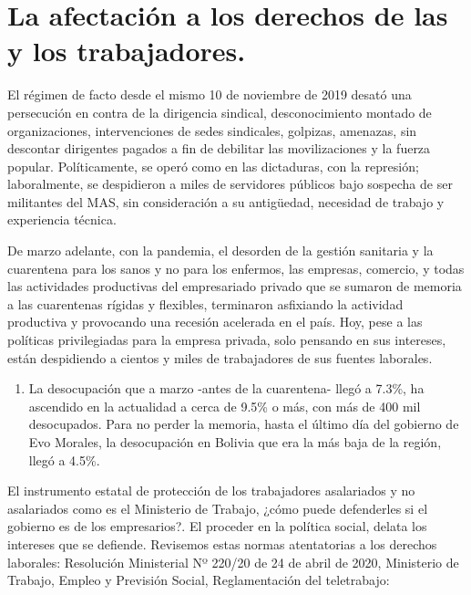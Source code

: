 \documentclass[a4paper, nobind]{templates/ociamthesis}
\providecommand{\tightlist}{%
  \setlength{\itemsep}{0pt}\setlength{\parskip}{0pt}}
\begin{document}
\hypertarget{la-afectaciuxf3n-a-los-derechos-de-las-y-los-trabajadores.}{%
\chapter{La afectación a los derechos de las y los trabajadores.}\label{la-afectaciuxf3n-a-los-derechos-de-las-y-los-trabajadores.}}

El régimen de facto desde el mismo 10 de noviembre de 2019 desató una persecución en contra de la dirigencia sindical, desconocimiento montado de organizaciones, intervenciones de sedes sindicales, golpizas, amenazas, sin descontar dirigentes pagados a fin de debilitar las movilizaciones y la fuerza popular. Políticamente, se operó como en las dictaduras, con la represión; laboralmente, se despidieron a miles de servidores públicos bajo sospecha de ser militantes del MAS, sin consideración a su antigüedad, necesidad de trabajo y experiencia técnica.

De marzo adelante, con la pandemia, el desorden de la gestión sanitaria y la cuarentena para los sanos y no para los enfermos, las empresas, comercio, y todas las actividades productivas del empresariado privado que se sumaron de memoria a las cuarentenas rígidas y flexibles, terminaron asfixiando la actividad productiva y provocando una recesión acelerada en el país. Hoy, pese a las políticas privilegiadas para la empresa privada, solo pensando en sus intereses, están despidiendo a cientos y miles de trabajadores de sus fuentes laborales.

\begin{enumerate}
\def\labelenumi{\arabic{enumi}.}
\tightlist
\item
  La desocupación que a marzo -antes de la cuarentena- llegó a 7.3\%, ha ascendido en la actualidad a cerca de 9.5\% o más, con más de 400 mil desocupados. Para no perder la memoria, hasta el último día del gobierno de Evo Morales, la desocupación en Bolivia que era la más baja de la región, llegó a 4.5\%.
\end{enumerate}

El instrumento estatal de protección de los trabajadores asalariados y no asalariados como es el Ministerio de Trabajo, ¿cómo puede defenderles si el gobierno es de los empresarios?. El proceder en la política social, delata los intereses que se defiende. Revisemos estas normas atentatorias a los derechos laborales:
Resolución Ministerial Nº 220/20 de 24 de abril de 2020, Ministerio de Trabajo, Empleo y Previsión Social, Reglamentación del teletrabajo:
\end{document}
